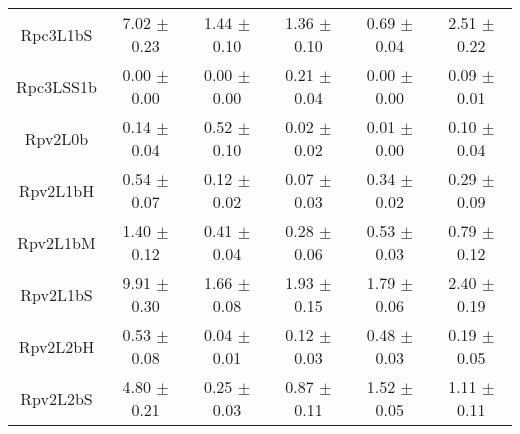\begin{table}[!htb]
{\begin{tabular}{|c|c|c|c|c|c|}
 Rpc3L1bS  &     7.02 $\pm$ 0.23   &     1.44 $\pm$ 0.10  &     1.36 $\pm$ 0.10  &     0.69 $\pm$ 0.04    &     2.51 $\pm$ 0.22  \\
 Rpc3LSS1b  &     0.00 $\pm$ 0.00   &     0.00 $\pm$ 0.00  &     0.21 $\pm$ 0.04  &     0.00 $\pm$ 0.00    &     0.09 $\pm$ 0.01  \\
 Rpv2L0b  &     0.14 $\pm$ 0.04   &     0.52 $\pm$ 0.10  &     0.02 $\pm$ 0.02  &     0.01 $\pm$ 0.00    &     0.10 $\pm$ 0.04  \\
 Rpv2L1bH  &     0.54 $\pm$ 0.07   &     0.12 $\pm$ 0.02  &     0.07 $\pm$ 0.03  &     0.34 $\pm$ 0.02    &     0.29 $\pm$ 0.09  \\
 Rpv2L1bM  &     1.40 $\pm$ 0.12   &     0.41 $\pm$ 0.04  &     0.28 $\pm$ 0.06  &     0.53 $\pm$ 0.03    &     0.79 $\pm$ 0.12  \\
 Rpv2L1bS  &     9.91 $\pm$ 0.30   &     1.66 $\pm$ 0.08  &     1.93 $\pm$ 0.15  &     1.79 $\pm$ 0.06    &     2.40 $\pm$ 0.19  \\
 Rpv2L2bH  &     0.53 $\pm$ 0.08   &     0.04 $\pm$ 0.01  &     0.12 $\pm$ 0.03  &     0.48 $\pm$ 0.03    &     0.19 $\pm$ 0.05  \\
 Rpv2L2bS  &     4.80 $\pm$ 0.21   &     0.25 $\pm$ 0.03  &     0.87 $\pm$ 0.11  &     1.52 $\pm$ 0.05    &     1.11 $\pm$ 0.11  \\
 
\hline\hline
\end{tabular}}
\end{table}

